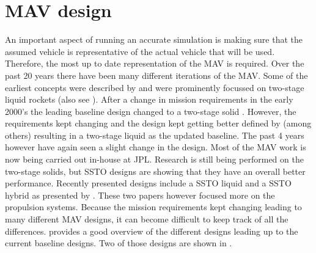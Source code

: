 \section{\ac{MAV} design}
\label{sec:mavDesign}
An important aspect of running an accurate simulation is making sure that the assumed vehicle is representative of the actual vehicle that will be used. Therefore, the most up to date representation of the \ac{MAV} is required. Over the past 20 years there have been many different iterations of the \ac{MAV}. Some of the earliest concepts were described by \cite{whitehead1997,guernsey1998,desai1998,stone1999} and were prominently focussed on two-stage liquid rockets (also see ). After a change in mission requirements in the early 2000's the leading baseline design changed to a two-stage solid \citep{stephenson2002,whitehead2005,stephenson2006}. However, the requirements kept changing and the design kept getting better defined by (among others) \cite{sengupta2012,trinidad2012,mungas2012,mppg2012} resulting in a two-stage liquid as the updated baseline. The past 4 years however have again seen a slight change in the design. Most of the \ac{MAV} work is now being carried out in-house at \ac{JPL}. Research is still being performed on the two-stage solids, but \ac{SSTO} designs are showing that they have an overall better performance. Recently presented designs include a \ac{SSTO} liquid \citep{vaughan2016technology} and a \ac{SSTO} hybrid as presented by \cite{karp2016technology}. These two papers however focused more on the propulsion systems. Because the mission requirements kept changing leading to many different \ac{MAV} designs, it can become difficult to keep track of all the differences. \cite{shotwell2016history} provides a good overview of the different designs leading up to the current baseline designs. Two of those designs are shown in . \\ 


